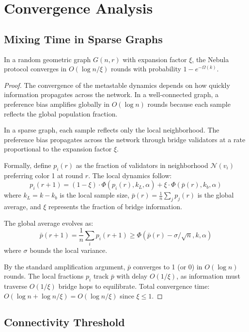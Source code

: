 \section{Convergence Analysis}

\label{sec:convergence}

\subsection{Mixing Time in Sparse Graphs}

\begin{theorem}
\label{thm:nebula-convergence}
In a random geometric graph $G(n, r)$ with expansion factor $\xi$, the Nebula protocol
converges in $O(\log n / \xi)$ rounds with probability $1 - e^{-\Omega(k)}$.
\end{theorem}

\begin{proof}
The convergence of the metastable dynamics depends on how quickly information propagates
across the network. In a well-connected graph, a preference bias amplifies globally in
$O(\log n)$ rounds because each sample reflects the global population fraction.

In a sparse graph, each sample reflects only the local neighborhood. The preference
bias propagates across the network through bridge validators at a rate proportional
to the expansion factor $\xi$.

Formally, define $p_i(r)$ as the fraction of validators in neighborhood $\mathcal{N}(v_i)$
preferring color 1 at round $r$. The local dynamics follow:
\[
p_i(r+1) = (1 - \xi) \cdot \Phi(p_i(r), k_L, \alpha) + \xi \cdot \Phi(\bar{p}(r), k_b, \alpha)
\]
where $k_L = k - k_b$ is the local sample size, $\bar{p}(r) = \frac{1}{n}\sum_j p_j(r)$
is the global average, and $\xi$ represents the fraction of bridge information.

The global average evolves as:
\[
\bar{p}(r+1) = \frac{1}{n} \sum_i p_i(r+1) \geq \Phi(\bar{p}(r) - \sigma/\sqrt{n}, k, \alpha)
\]
where $\sigma$ bounds the local variance.

By the standard amplification argument, $\bar{p}$ converges to 1 (or 0) in $O(\log n)$
rounds. The local fractions $p_i$ track $\bar{p}$ with delay $O(1/\xi)$, as information
must traverse $O(1/\xi)$ bridge hops to equilibrate. Total convergence time:
$O(\log n + \log n / \xi) = O(\log n / \xi)$ since $\xi \leq 1$.
\end{proof}

\subsection{Connectivity Threshold}

